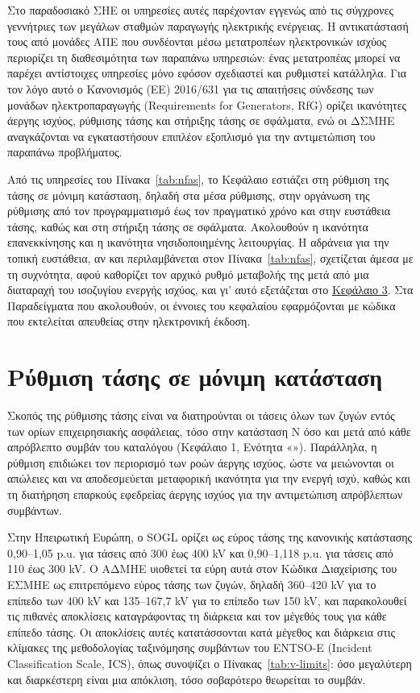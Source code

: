 Στο παραδοσιακό ΣΗΕ οι υπηρεσίες αυτές παρέχονταν εγγενώς από τις σύγχρονες γεννήτριες
των μεγάλων σταθμών παραγωγής ηλεκτρικής ενέργειας. Η αντικατάστασή τους από μονάδες ΑΠΕ που συνδέονται μέσω
μετατροπέων ηλεκτρονικών ισχύος περιορίζει τη διαθεσιμότητα των παραπάνω υπηρεσιών: ένας μετατροπέας μπορεί να παρέχει αντίστοιχες
υπηρεσίες μόνο εφόσον σχεδιαστεί και ρυθμιστεί κατάλληλα. Για τον λόγο αυτό ο Κανονισμός (ΕΕ) 2016/631 για τις απαιτήσεις σύνδεσης
των μονάδων ηλεκτροπαραγωγής (Requirements for Generators, RfG) ορίζει ικανότητες άεργης
ισχύος, ρύθμισης τάσης και στήριξης τάσης σε σφάλματα, ενώ οι ΔΣΜΗΕ αναγκάζονται να εγκαταστήσουν
επιπλέον εξοπλισμό για την αντιμετώπιση του παραπάνω προβλήματος.

Από τις υπηρεσίες του Πίνακα~\ref{tab:nfas}, το Κεφάλαιο εστιάζει στη ρύθμιση της τάσης σε
μόνιμη κατάσταση, δηλαδή στα μέσα ρύθμισης, στην οργάνωση της ρύθμισης από τον προγραμματισμό
έως τον πραγματικό χρόνο και στην ευστάθεια τάσης, καθώς και στη στήριξη τάσης
σε σφάλματα. Ακολουθούν η ικανότητα επανεκκίνησης και η ικανότητα νησιδοποιημένης
λειτουργίας. Η αδράνεια για την τοπική ευστάθεια, αν και περιλαμβάνεται στον Πίνακα~\ref{tab:nfas}, σχετίζεται
άμεσα με τη συχνότητα, αφού καθορίζει τον αρχικό ρυθμό μεταβολής της μετά από μια διαταραχή του
ισοζυγίου ενεργής ισχύος, και γι' αυτό εξετάζεται στο \hyperref[kef-03-theoria]{Κεφάλαιο 3}.
Στα Παραδείγματα που ακολουθούν, οι έννοιες του κεφαλαίου εφαρμόζονται με κώδικα που εκτελείται
απευθείας στην ηλεκτρονική έκδοση.

\section{Ρύθμιση τάσης σε μόνιμη κατάσταση}
\label{sec:v-control}

Σκοπός της ρύθμισης τάσης είναι να διατηρούνται οι τάσεις όλων των ζυγών εντός των ορίων
επιχειρησιακής ασφάλειας, τόσο στην κατάσταση N όσο και μετά από κάθε απρόβλεπτο συμβάν του
καταλόγου (Κεφάλαιο 1, Ενότητα «»). Παράλληλα, η ρύθμιση επιδιώκει τον περιορισμό των ροών άεργης ισχύος, ώστε να
μειώνονται οι απώλειες και να αποδεσμεύεται μεταφορική ικανότητα για την ενεργή ισχύ, καθώς
και τη διατήρηση επαρκούς εφεδρείας άεργης ισχύος για την αντιμετώπιση απρόβλεπτων
συμβάντων.

Στην Ηπειρωτική Ευρώπη, ο SOGL ορίζει ως εύρος τάσης της κανονικής κατάστασης
0,90--1,05 p.u. για τάσεις από 300 έως 400 kV και 0,90--1,118 p.u. για τάσεις από 110 έως
300 kV. Ο ΑΔΜΗΕ υιοθετεί τα εύρη αυτά στον Κώδικα Διαχείρισης του ΕΣΜΗΕ ως επιτρεπόμενο εύρος
τάσης των ζυγών, δηλαδή 360--420 kV για το επίπεδο των 400 kV και 135--167,7 kV για το
επίπεδο των 150 kV, και παρακολουθεί τις πιθανές αποκλίσεις καταγράφοντας τη διάρκεια και τον μέγεθός τους για κάθε επίπεδο τάσης. Οι αποκλίσεις αυτές
κατατάσσονται κατά μέγεθος και διάρκεια στις κλίμακες της μεθοδολογίας ταξινόμησης συμβάντων
του ENTSO-E (Incident Classification Scale, ICS), όπως συνοψίζει ο Πίνακας~\ref{tab:v-limits}:
όσο μεγαλύτερη και διαρκέστερη είναι μια απόκλιση, τόσο σοβαρότερο θεωρείται το συμβάν.

